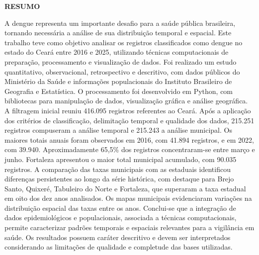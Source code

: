 \vspace{1em}
\begin{center}
    \textbf{RESUMO}
\end{center}

\noindent
A dengue representa um importante desafio para a saúde pública brasileira, tornando necessária a análise de sua distribuição temporal e espacial. Este trabalho teve como objetivo analisar os registros classificados como dengue no estado do Ceará entre 2016 e 2025, utilizando técnicas computacionais de preparação, processamento e visualização de dados. Foi realizado um estudo quantitativo, observacional, retrospectivo e descritivo, com dados públicos do Ministério da Saúde e informações populacionais do Instituto Brasileiro de Geografia e Estatística. O processamento foi desenvolvido em Python, com bibliotecas para manipulação de dados, visualização gráfica e análise geográfica. A filtragem inicial reuniu 416.095 registros referentes ao Ceará. Após a aplicação dos critérios de classificação, delimitação temporal e qualidade dos dados, 215.251 registros compuseram a análise temporal e 215.243 a análise municipal. Os maiores totais anuais foram observados em 2016, com 41.894 registros, e em 2022, com 39.940. Aproximadamente 65,5\% dos registros concentraram-se entre março e junho. Fortaleza apresentou o maior total municipal acumulado, com 90.035 registros. A comparação das taxas municipais com as estaduais identificou diferenças persistentes ao longo da série histórica, com destaque para Brejo Santo, Quixeré, Tabuleiro do Norte e Fortaleza, que superaram a taxa estadual em oito dos dez anos analisados. Os mapas municipais evidenciaram variações na distribuição espacial das taxas entre os anos. Conclui-se que a integração de dados epidemiológicos e populacionais, associada a técnicas computacionais, permite caracterizar padrões temporais e espaciais relevantes para a vigilância em saúde. Os resultados possuem caráter descritivo e devem ser interpretados considerando as limitações de qualidade e completude das bases utilizadas.

\vspace{0.5cm}

